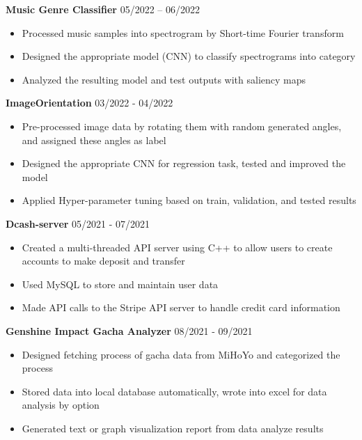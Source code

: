 \documentclass[margin,line]{res}
\begin{document}
\begin{resume}
\textbf{Music Genre Classifier} \hfill {05/2022 -- 06/2022} \\
\begin{itemize}
	\item Processed music samples into spectrogram by Short-time Fourier transform
	\item Designed the appropriate model (CNN) to classify spectrograms into category
	\item Analyzed the resulting model and test outputs with saliency maps
\end{itemize}

\textbf{ImageOrientation} \hfill {03/2022 - 04/2022} \\
\begin{itemize}
	\item Pre-processed image data by rotating them with random generated angles, and assigned these angles as label
	\item Designed the appropriate CNN for regression task, tested and improved the model
	\item Applied Hyper-parameter tuning based on train, validation, and tested results 
\end{itemize}

\textbf{Dcash-server} \hfill {05/2021 - 07/2021} \\
\begin{itemize}
	\item Created a multi-threaded API server using C++ to allow users to create accounts to make deposit and transfer
	\item Used MySQL to store and maintain user data
	\item Made API calls to the Stripe API server to handle credit card information
\end{itemize}

\textbf{Genshine Impact Gacha Analyzer} \hfill {08/2021 - 09/2021} \\
\begin{itemize}
	\item Designed fetching process of gacha data from MiHoYo and categorized the process 
	\item Stored data into local database automatically, wrote into excel for data analysis by option
	\item Generated text or graph visualization report from data analyze results
\end{itemize}


\end{resume}
\end{document}
